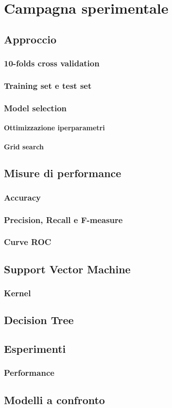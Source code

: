 \chapter{Campagna sperimentale}

\section{Approccio}
\subsection{10-folds cross validation}

\subsection{Training set e test set}

\subsection{Model selection}
\subsubsection{Ottimizzazione iperparametri}
\subsubsection{Grid search}

\section{Misure di performance}
\subsection{Accuracy}
\subsection{Precision, Recall e F-measure}
\subsection{Curve ROC}

\section{Support Vector Machine}
\subsection{Kernel}

\section{Decision Tree}

\section{Esperimenti}
\subsection{Performance}
\section{Modelli a confronto}
